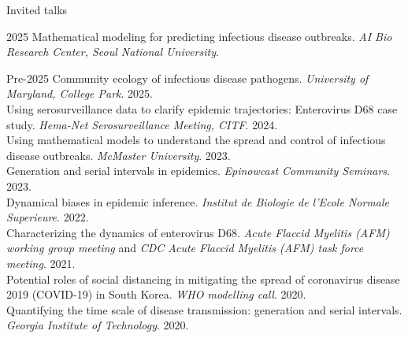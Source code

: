 \documentclass[
	11pt, %
]{resume} %
\newenvironment{yeardesc}[1][3.2cm]{%
  \begin{list}{}{%
    \setlength{\labelwidth}{#1}%
    \setlength{\labelsep}{0.6em}
    \setlength{\leftmargin}{\labelwidth}%
    \addtolength{\leftmargin}{\labelsep}
    \setlength{\itemsep}{.25\baselineskip}
    \setlength{\topsep}{.25\baselineskip}
    \renewcommand\makelabel[1]{\bfseries ##1\hfil\newline}%
  }%
}{\end{list}}
\begin{document}
\begin{rSection}{Invited talks}

\begin{yeardesc}[2.2cm] %
  \item[2025]
  Mathematical modeling for predicting infectious disease outbreaks. \textit{AI Bio Research Center, Seoul National University}.

  \item[Pre-2025]
  Community ecology of infectious disease pathogens. \textit{University of Maryland, College Park}. 2025.\\
  Using serosurveillance data to clarify epidemic trajectories: Enterovirus D68 case study. \textit{Hema-Net Serosurveillance Meeting, CITF}. 2024.\\
  Using mathematical models to understand the spread and control of infectious disease outbreaks. \textit{McMaster University}. 2023.\\
  Generation and serial intervals in epidemics. \textit{Epinowcast Community Seminars}. 2023.\\
  Dynamical biases in epidemic inference. \textit{Institut de Biologie de l'Ecole Normale Superieure}. 2022.\\
  Characterizing the dynamics of enterovirus D68. \textit{Acute Flaccid Myelitis (AFM) working group meeting} and \textit{CDC Acute Flaccid Myelitis (AFM) task force meeting}. 2021.\\
  Potential roles of social distancing in mitigating the spread of coronavirus disease 2019 (COVID-19) in South Korea. \textit{WHO modelling call}. 2020.\\
  Quantifying the time scale of disease transmission: generation and serial intervals. \textit{Georgia Institute of Technology}. 2020.
\end{yeardesc}

\end{rSection}
\end{document}
